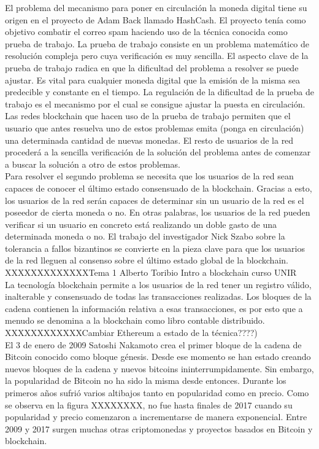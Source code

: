 El problema del mecanismo para poner en circulación la moneda digital tiene su origen en el proyecto de Adam Back llamado HashCash. El proyecto tenía como objetivo combatir el correo spam haciendo uso de la técnica conocida como prueba de trabajo. La prueba de trabajo consiste en un problema matemático de resolución compleja pero cuya verificación es muy sencilla. El aspecto clave de la prueba de trabajo radica en que la dificultad del problema a resolver se puede ajustar. Es vital para cualquier moneda digital que la emisión de la misma sea predecible y constante en el tiempo. La regulación de la dificultad de la prueba de trabajo es el mecanismo por el cual se consigue ajustar la puesta en circulación. Las redes blockchain que hacen uso de la prueba de trabajo permiten que el usuario que antes resuelva uno de estos problemas emita (ponga en circulación) una determinada cantidad de nuevas monedas. El resto de usuarios de la red procederá a la sencilla verificación de la solución del problema antes de comenzar a buscar la solución a otro de estos problemas. \\
Para resolver el segundo problema se necesita que los usuarios de la red sean capaces de conocer el último estado consensuado de la blockchain. Gracias a esto, los usuarios de la red serán capaces de determinar sin un usuario de la red es el poseedor de cierta moneda o no. En otras palabras, los usuarios de la red pueden verificar si un usuario en concreto está realizando un doble gasto de una determinada moneda o no. El trabajo del investigador Nick Szabo sobre la tolerancia a fallos bizantinos se convierte en la pieza clave para que los usuarios de la red lleguen al consenso sobre el último estado global de la blockchain. \\
XXXXXXXXXXXXXTema 1 Alberto Toribio Intro a blockchain curso UNIR \\
La tecnología blockchain permite a los usuarios de la red tener un registro válido, inalterable y consensuado de todas las transacciones realizadas. Los bloques de la cadena contienen la información relativa a esas transacciones, es por esto que a menudo se denomina a la blockchain como libro contable distribuido. \\
XXXXXXXXXXXXCambiar Ethereum a estado de la técnica????) \\
El 3 de enero de 2009 Satoshi Nakamoto crea el primer bloque de la cadena de Bitcoin conocido como bloque génesis. Desde ese momento se han estado creando nuevos bloques de la cadena y nuevos bitcoins ininterrumpidamente. Sin embargo, la popularidad de Bitcoin no ha sido la misma desde entonces. Durante los primeros años sufrió varios altibajos tanto en popularidad como en precio. Como se observa en la figura XXXXXXXX, no fue hasta finales de 2017 cuando su popularidad y precio comenzaron a incrementarse de manera exponencial. Entre 2009 y 2017 surgen muchas otras criptomonedas y proyectos basados en Bitcoin y blockchain.

